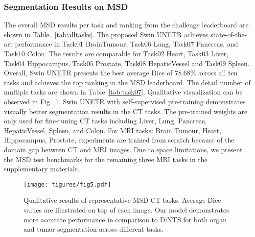 \documentclass[10pt,twocolumn,letterpaper]{article}
\begin{document}
\subsubsection{Segmentation Results on MSD}
 The overall MSD results per task and ranking from the challenge leaderboard are shown in Table.~\ref{tab:alltasks}. The proposed Swin UNETR achieves state-of-the-art performance in Task01 BrainTumour, Task06 Lung, Task07 Pancreas, and Task10 Colon. The results are comparable for Task02 Heart, Task03 Liver, Task04 Hippocampus, Task05 Prostate, Task08 HepaticVessel and Task09 Spleen. Overall, Swin UNETR presents the best average Dice of 78.68\% across all ten tasks and achieves the top ranking in the MSD leaderboard. The detail number of multiple tasks are shown in Table~\ref{tab:task07}. Qualitative visualization can be observed in Fig.~\ref{fig:fig5}. Swin UNETR with self-supervised pre-training demonstrates visually better segmentation results in the CT tasks. The pre-trained weights are only used for fine-tuning CT tasks including Liver, Lung, Pancreas, HepaticVessel, Spleen, and Colon. For MRI tasks: Brain Tumour, Heart, Hippocampus, Prostate, experiments are trained from scratch because of the domain gap between CT and MRI images. Due to space limitations, we present the MSD test benchmarks for the remaining three MRI tasks in the supplementary materials.
 
 \begin{figure}[t]
\texttt{[image: figures/fig5.pdf]}
\caption{Qualitative results of representative MSD CT tasks. Average Dice values are illustrated on top of each image. Our model demonstrates more accurate performance in comparison to DiNTS for both organ and tumor segmentation across different tasks.}
  \label{fig:fig5}
\end{figure}

\begin{table}[!t]
\centering
{}
\vspace{1mm}

\caption{Ablation study of the effectiveness of each objective function in the proposed pre-training loss. HD denotes Hausdorff Distance. Experiments on fine-tuning the BTCV dataset.
}
\vspace{0.2mm}
\label{table:loss_ablation_table}
\end{table}
\end{document}
